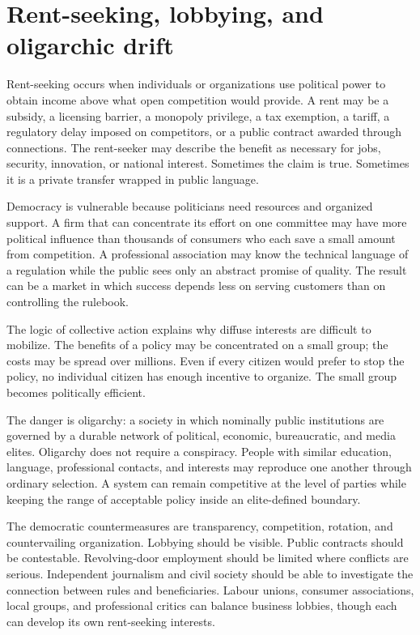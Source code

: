 ﻿\documentclass[12pt,a4paper]{book}
\begin{document}
\section{Rent-seeking, lobbying, and oligarchic drift}

Rent-seeking occurs when individuals or organizations use political power
to obtain income above what open competition would provide.  A rent may be
a subsidy, a licensing barrier, a monopoly privilege, a tax exemption, a
tariff, a regulatory delay imposed on competitors, or a public contract
awarded through connections.  The rent-seeker may describe the benefit as
necessary for jobs, security, innovation, or national interest.  Sometimes
the claim is true.  Sometimes it is a private transfer wrapped in public
language.

Democracy is vulnerable because politicians need resources and organized
support.  A firm that can concentrate its effort on one committee may have
more political influence than thousands of consumers who each save a small
amount from competition.  A professional association may know the technical
language of a regulation while the public sees only an abstract promise of
quality.  The result can be a market in which success depends less on
serving customers than on controlling the rulebook.

The logic of collective action explains why diffuse interests are difficult
to mobilize.  The benefits of a policy may be concentrated on a small group;
the costs may be spread over millions.  Even if every citizen would prefer
to stop the policy, no individual citizen has enough incentive to organize.
The small group becomes politically efficient.

The danger is oligarchy: a society in which nominally public institutions
are governed by a durable network of political, economic, bureaucratic, and
media elites.  Oligarchy does not require a conspiracy.  People with similar
education, language, professional contacts, and interests may reproduce one
another through ordinary selection.  A system can remain competitive at the
level of parties while keeping the range of acceptable policy inside an
elite-defined boundary.

The democratic countermeasures are transparency, competition, rotation, and
countervailing organization.  Lobbying should be visible.  Public contracts
should be contestable.  Revolving-door employment should be limited where
conflicts are serious.  Independent journalism and civil society should be
able to investigate the connection between rules and beneficiaries.  Labour
unions, consumer associations, local groups, and professional critics can
balance business lobbies, though each can develop its own rent-seeking
interests.
\end{document}
